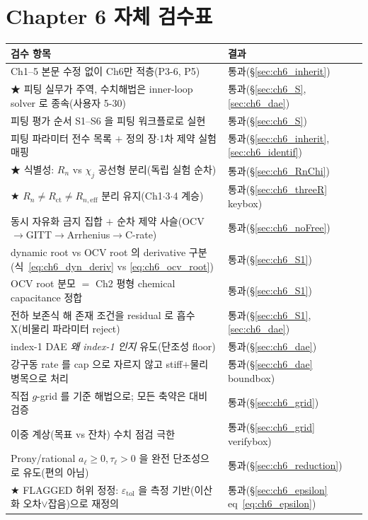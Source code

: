 \documentclass[11pt,a4paper]{article}
\newcommand{\eff}{\mathrm{eff}}
\newcommand{\ct}{\mathrm{ct}}
\newcommand{\tol}{\mathrm{tol}}
\begin{document}
\section{Chapter 6 자체 검수표}\label{sec:ch6_selfcheck}
{\small
\begin{longtable}{p{} p{}}
\toprule 검수 항목 & 결과 \\ \midrule \endhead
Ch1--5 본문 수정 없이 Ch6만 적층(P3-6, P5) & 통과(\S\ref{sec:ch6_inherit}) \\
★ 피팅 실무가 주역, 수치해법은 inner-loop solver 로 종속(사용자 5-30) & 통과(\S\ref{sec:ch6_S},\ref{sec:ch6_dae}) \\
피팅 평가 순서 S1--S6 을 피팅 워크플로로 실현 & 통과(\S\ref{sec:ch6_S}) \\
피팅 파라미터 전수 목록 $+$ 정의 장$\cdot$1차 제약 실험 매핑 & 통과(\S\ref{sec:ch6_inherit},\ref{sec:ch6_identif}) \\
★ 식별성: $R_n$ vs $\chi_j$ 공선형 분리(독립 실험 순차) & 통과(\S\ref{sec:ch6_RnChi}) \\
★ $R_n\ne R_\ct\ne R_{n,\eff}$ 분리 유지(Ch1$\cdot$3$\cdot$4 계승) & 통과(\S\ref{sec:ch6_threeR} keybox) \\
동시 자유화 금지 집합 $+$ 순차 제약 사슬(OCV$\to$GITT$\to$Arrhenius$\to$C-rate) & 통과(\S\ref{sec:ch6_noFree}) \\
dynamic root vs OCV root 의 derivative 구분(식~\eqref{eq:ch6_dyn_deriv} vs \eqref{eq:ch6_ocv_root}) & 통과(\S\ref{sec:ch6_S1}) \\
OCV root 분모 $=$ Ch2 평형 chemical capacitance 정합 & 통과(\S\ref{sec:ch6_S1}) \\
전하 보존식 해 존재 조건을 residual 로 흡수 X(비물리 파라미터 reject) & 통과(\S\ref{sec:ch6_S1},\ref{sec:ch6_dae}) \\
index-1 DAE \emph{왜 index-1 인지} 유도(단조성 floor) & 통과(\S\ref{sec:ch6_dae}) \\
강구동 rate 를 cap 으로 자르지 않고 stiff$+$물리 병목으로 처리 & 통과(\S\ref{sec:ch6_dae} boundbox) \\
직접 $g$-grid 를 기준 해법으로; 모든 축약은 대비 검증 & 통과(\S\ref{sec:ch6_grid}) \\
이중 계상(목표 vs 잔차) 수치 점검 극한 & 통과(\S\ref{sec:ch6_grid} verifybox) \\
Prony/rational $a_\ell\ge0,\tau_\ell>0$ 을 완전 단조성으로 유도(편의 아님) & 통과(\S\ref{sec:ch6_reduction}) \\
★ FLAGGED 허위 정정: $\varepsilon_\tol$ 을 측정 기반(이산화 오차$\vee$잡음)으로 재정의 & 통과(\S\ref{sec:ch6_epsilon} eq~\eqref{eq:ch6_epsilon}) \\

\end{longtable}}
\end{document}
